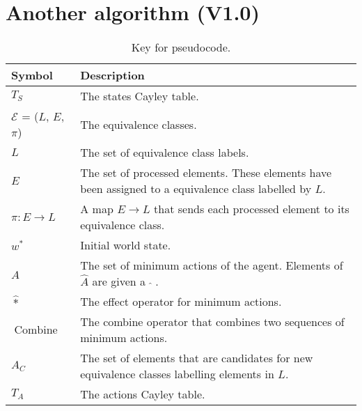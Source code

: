 \chapter{Another algorithm
(V1.0)
}
\begin{table*}
	\centering
	\begin{tabularx}{\textwidth}{@{}lX@{}}
		\toprule
		\textbf{Symbol}                         & \textbf{Description}                                                                                     \\
		\midrule
		$T_{S}$                                 & The states Cayley table.                                                                                 \\
		$\mathcal{E}$ = ($L$, \; $E$, \; $\pi$) & The equivalence classes.                                                                                 \\
		$L$                                     & The set of equivalence class labels.                                                                     \\
		$E$                                     & The set of processed elements. These elements have been assigned to a equivalence class labelled by $L$. \\
		$\pi: E \to L$                          & A map $E \to L$ that sends each processed element to its equivalence class.                              \\
		$w^{*}$                                 & Initial world state.                                                                                     \\
		$\hat{A}$                               & The set of minimum actions of the agent. Elements of $\hat{A}$ are given a $\; \hat{ } \;$.              \\
		$\hat{*}$                               & The effect operator for minimum actions.                                                                 \\
		$\operatorname{Combine}$                & The combine operator that combines two sequences of minimum actions.                                     \\
		$A_{C}$                                 & The set of elements that are candidates for new equivalence classes labelling elements in $L$.           \\
		$T_{A}$                                 & The actions Cayley table.                                                                                \\
		\bottomrule
	\end{tabularx}
	\caption{Key for pseudocode.}
	\label{tab:pseudocode_key}
\end{table*}



